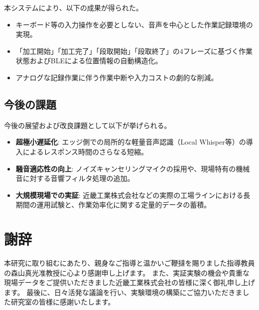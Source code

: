 \documentclass[a4paper,12pt,ja=standard,lualatex]{bxjsarticle}
\begin{document}
本システムにより、以下の成果が得られた。
\begin{itemize}
    \item キーボード等の入力操作を必要としない、音声を中心とした作業記録環境の実現。
    \item 「加工開始」「加工完了」「段取開始」「段取終了」の4フレーズに基づく作業状態およびBLEによる位置情報の自動構造化。
    \item アナログな記録作業に伴う作業中断や入力コストの劇的な削減。
\end{itemize}

\subsection{今後の課題}
今後の展望および改良課題として以下が挙げられる。
\begin{itemize}
    \item \textbf{超極小遅延化}: エッジ側での局所的な軽量音声認識（Local Whisper等）の導入によるレスポンス時間のさらなる短縮。
    \item \textbf{騒音適応性の向上}: ノイズキャンセリングマイクの採用や、現場特有の機械音に対する音響フィルタ処理の追加。
    \item \textbf{大規模現場での実証}: 近畿工業株式会社などの実際の工場ラインにおける長期間の運用試験と、作業効率化に関する定量的データの蓄積。
\end{itemize}

\newpage

\section*{謝辞}
本研究に取り組むにあたり、親身なご指導と温かいご鞭撻を賜りました指導教員の森山真光准教授に心より感謝申し上げます。
また、実証実験の機会や貴重な現場データをご提供いただきました近畿工業株式会社の皆様に深く御礼申し上げます。
最後に、日々活発な議論を行い、実験環境の構築にご協力いただきました研究室の皆様に感謝いたします。

\newpage
\end{document}

